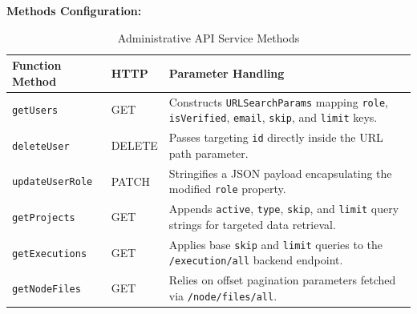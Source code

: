 \vspace{0.2cm}
\noindent\textbf{Methods Configuration:}
\begin{table}[htbp]
\centering
\caption{Administrative API Service Methods}
\label{tab:admin-api-methods}
\begin{tabular}{|p{3.5cm}|p{2cm}|p{7.5cm}|}
\hline
\textbf{Function Method} & \textbf{HTTP} & \textbf{Parameter Handling} \\
\hline
\texttt{getUsers} & GET & Constructs \texttt{URLSearchParams} mapping \texttt{role}, \texttt{isVerified}, \texttt{email}, \texttt{skip}, and \texttt{limit} keys. \\
\hline
\texttt{deleteUser} & DELETE & Passes targeting \texttt{id} directly inside the URL path parameter. \\
\hline
\texttt{updateUserRole} & PATCH & Stringifies a JSON payload encapsulating the modified \texttt{role} property. \\
\hline
\texttt{getProjects} & GET & Appends \texttt{active}, \texttt{type}, \texttt{skip}, and \texttt{limit} query strings for targeted data retrieval. \\
\hline
\texttt{getExecutions} & GET & Applies base \texttt{skip} and \texttt{limit} queries to the \texttt{/execution/all} backend endpoint. \\
\hline
\texttt{getNodeFiles} & GET & Relies on offset pagination parameters fetched via \texttt{/node/files/all}. \\
\hline
\end{tabular}
\end{table}